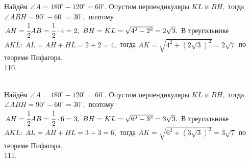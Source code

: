 \documentclass[12pt]{article}
\begin{document}
Найдём $\angle A=180^\circ-120^\circ=60^\circ.$ Опустим перпендикуляры $KL$ и $BH,$ тогда $\angle ABH=90^\circ-60^\circ=30^\circ,$ поэтому $AH=\cfrac{1}{2}AB=\cfrac{1}{2}\cdot4=2,\ BH=KL=\sqrt{4^2-2^2}=2\sqrt{3}.$ В треугольнике $AKL:\ AL=AH+HL=2+2=4,$ тогда $AK=\sqrt{4^2+(2\sqrt{3})^2}=2\sqrt{7}$ по теореме Пифагора.\\
110. \begin{figure}[ht!]
\end{figure}\\
Найдём $\angle A=180^\circ-120^\circ=60^\circ.$ Опустим перпендикуляры $KL$ и $BH,$ тогда $\angle ABH=90^\circ-60^\circ=30^\circ,$ поэтому $AH=\cfrac{1}{2}AB=\cfrac{1}{2}\cdot6=3,\ BH=KL=\sqrt{6^2-3^2}=3\sqrt{3}.$ В треугольнике $AKL:\ AL=AH+HL=3+3=6,$ тогда $AK=\sqrt{6^2+(3\sqrt{3})^2}=3\sqrt{7}$ по теореме Пифагора.\\
111. \begin{figure}[ht!]
\end{figure}\\
\end{document}
